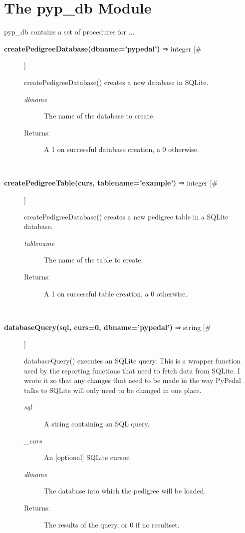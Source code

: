 \documentclass{article}
\begin{document}
\section*{The pyp\_db Module}
\par pyp\_db contains a set of procedures for ...
\begin{description}
\item[\textbf{createPedigreeDatabase(dbname='pypedal')} ⇒ integer [\#]
]
\par createPedigreeDatabase() creates a new database in SQLite.
\begin{description}
\item[\textit{dbname}
]
The name of the database to create.
\item[Returns:
]
A 1 on successful database creation, a 0 otherwise.
\end{description}\\

\item[\textbf{createPedigreeTable(curs, tablename='example')} ⇒ integer [\#]
]
\par createPedigreeDatabase() creates a new pedigree table in a SQLite
database.
\begin{description}
\item[\textit{tablename}
]
The name of the table to create.
\item[Returns:
]
A 1 on successful table creation, a 0 otherwise.
\end{description}\\

\item[\textbf{databaseQuery(sql, curs=0, dbname='pypedal')} ⇒ string [\#]
]
\par databaseQuery() executes an SQLite query.  This is a wrapper function
used by the reporting functions that need to fetch data from SQLite.
I wrote it so that any changes that need to be made in the way PyPedal
talks to SQLite will only need to be changed in one place.
\begin{description}
\item[\textit{sql}
]
A string containing an SQL query.
\item[\textit{\_curs}
]
An [optional] SQLite cursor.
\item[\textit{dbname}
]
The database into which the pedigree will be loaded.
\item[Returns:
]
The results of the query, or 0 if no resultset.
\end{description}\\


\end{description}
\end{document}
